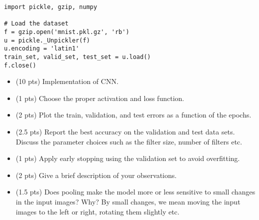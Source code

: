 \documentclass{exam}
\begin{document}
\begin{questions}


 \begin{lstlisting}
import pickle, gzip, numpy

# Load the dataset
f = gzip.open('mnist.pkl.gz', 'rb')
u = pickle._Unpickler(f)
u.encoding = 'latin1'
train_set, valid_set, test_set = u.load()
f.close()
\end{lstlisting}


\begin{itemize}
\item (10 pts) Implementation of CNN.
\item (1 pts)  Choose the proper activation and loss function.
\item (2 pts) Plot the train, validation, and test errors as a function of the epochs. 
\item (2.5 pts) Report the best accuracy on the validation and test data sets. Discuss the parameter choices such as the filter size, number of filters etc.
\item (1 pts) Apply early stopping using the validation set to avoid overfitting.
\item (2 pts) Give a brief description of your observations.
\item (1.5 pts) Does pooling make the model more or less sensitive to small changes in the input images? Why? By small changes, we mean moving the input images to the left or right, rotating them slightly etc.
\end{itemize}

\end{questions}
\end{document}
